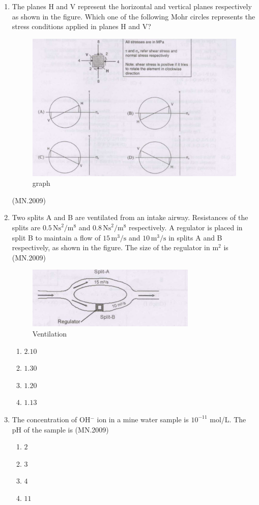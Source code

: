 \documentclass[journal]{IEEEtran}
\numberwithin{equation}{enumi}
\numberwithin{figure}{enumi}
\begin{document}
\begin{enumerate}
\item The planes H and V represent the horizontal and vertical planes respectively as shown in the figure. Which one of the following Mohr circles represents the stress conditions applied in planes H and V?

\begin{figure}[H]
\centering
\includegraphics[width=0.4\columnwidth]{figs/fig2.png}
\caption{graph}
\label{fig:placeholder}
\end{figure}
\hfill{(MN.2009)}

\item Two splits A and B are ventilated from an intake airway. Resistances of the splits are $0.5 \, \text{Ns}^2/\text{m}^8$ and $0.8 \, \text{Ns}^2/\text{m}^8$ respectively. A regulator is placed in split B to maintain a flow of $15 \, \text{m}^3/\text{s}$ and $10 \, \text{m}^3/\text{s}$ in splits A and B respectively, as shown in the figure. The size of the regulator in $\text{m}^2$ is
\hfill{(MN.2009)}
\begin{figure}[H]
  \centering
  \includegraphics[width=0.4\columnwidth]{figs/fig1.png}
  \caption{Ventilation}
  \label{fig:placeholder}
\end{figure}


\begin{enumerate}[label=(\Alph*)]
    \item $2.10$
    \item $1.30$
    \item $1.20$
    \item $1.13$
\end{enumerate}

\item The concentration of OH$^-$ ion in a mine water sample is $10^{-11}$ mol/L. The pH of the sample is
\hfill{(MN.2009)}

\begin{enumerate}[label=(\Alph*)]
    \item $2$
    \item $3$
    \item $4$
    \item $11$
\end{enumerate}


\end{enumerate}
\end{document}
